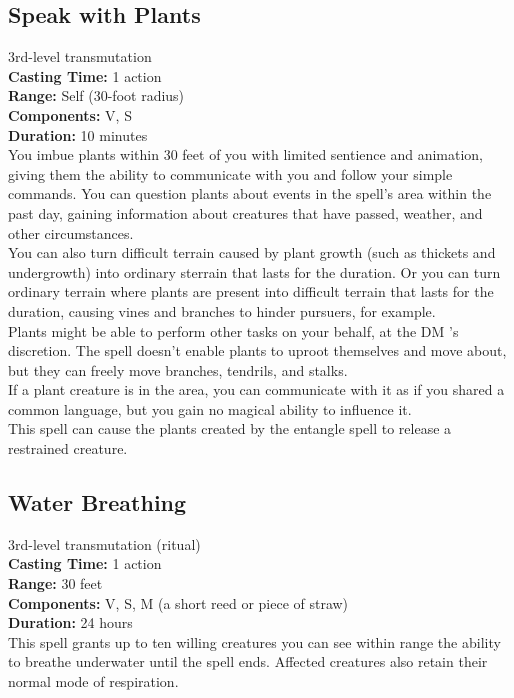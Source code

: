 \documentclass[11pt, A4paper, english]{article}
\begin{document}
		\subsection{Speak with Plants}
3rd-level transmutation \\
\textbf{Casting Time:} 1 action \\
\textbf{Range:} Self (30-foot radius) \\
\textbf{Components:} V, S \\
\textbf{Duration:} 10 minutes \\
You imbue plants within 30 feet of you with limited sentience and animation, giving them the ability to communicate with you and follow your simple commands. You can question plants about events in the spell’s area within the past day, gaining information about creatures that have passed, weather, and other circumstances. \\
You can also turn difficult terrain caused by plant growth (such as thickets and undergrowth) into ordinary sterrain that lasts for the duration. Or you can turn ordinary terrain where plants are present into difficult terrain that lasts for the duration, causing vines and branches to hinder pursuers, for example. \\
Plants might be able to perform other tasks on your behalf, at the DM ’s discretion. The spell doesn’t enable plants to uproot themselves and move about, but they can freely move branches, tendrils, and stalks. \\
If a plant creature is in the area, you can communicate with it as if you shared a common language, but you gain no magical ability to influence it. \\
This spell can cause the plants created by the entangle spell to release a restrained creature.

		\subsection{Water Breathing}
3rd-level transmutation (ritual) \\
\textbf{Casting Time:} 1 action \\
\textbf{Range:} 30 feet \\
\textbf{Components:} V, S, M (a short reed or piece of straw) \\
\textbf{Duration:} 24 hours \\
This spell grants up to ten willing creatures you can see within range the ability to breathe underwater until the spell ends. Affected creatures also retain their normal mode of respiration.
\end{document}
